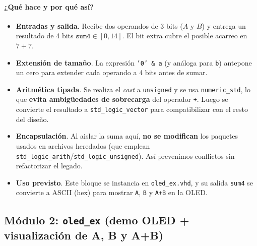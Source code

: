 \documentclass[a4paper,12pt]{article}
\begin{document}
\paragraph{¿Qué hace y por qué así?}
\begin{itemize}
  \item \textbf{Entradas y salida}. Recibe dos operandos de 3 bits (\(A\) y \(B\)) y entrega un resultado de 4 bits \( \texttt{sum4} \in [0,14]\). El bit extra cubre el posible acarreo en \(7+7\).
  \item \textbf{Extensión de tamaño}. La expresión \texttt{'0' \& a} (y análoga para \texttt{b}) antepone un cero para extender cada operando a 4 bits antes de sumar.
  \item \textbf{Aritmética tipada}. Se realiza el \emph{cast} a \texttt{unsigned} y se usa \texttt{numeric\_std}, lo que \textbf{evita ambigüedades de sobrecarga} del operador \texttt{+}. Luego se convierte el resultado a \texttt{std\_logic\_vector} para compatibilizar con el resto del diseño.
  \item \textbf{Encapsulación}. Al aislar la suma aquí, \textbf{no se modifican} los paquetes usados en archivos heredados (que emplean \texttt{std\_logic\_arith}/\texttt{std\_logic\_unsigned}). Así prevenimos conflictos sin refactorizar el legado.
  \item \textbf{Uso previsto}. Este bloque se instancia en \texttt{oled\_ex.vhd}, y su salida \texttt{sum4} se convierte a ASCII (hex) para mostrar \texttt{A}, \texttt{B} y \texttt{A+B} en la OLED.
\end{itemize}

\subsection{Módulo 2: \texttt{oled\_ex} (demo OLED + visualización de A, B y A+B)}
\end{document}
